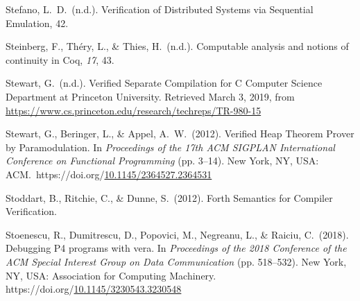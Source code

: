 \documentclass[12pt,twoside]{article}
\begin{document}
{\begin{thebibliography}{1079}
\mdbibitemlabel{}Stefano, L.~D.~(n.d.). Verification of Distributed Systems via Sequential Emulation, 42.%

\mdbibitemlabel{}Steinberg, F., Théry, L., \& Thies, H.~(n.d.). Computable analysis and notions of continuity in Coq, \emph{17}, 43.%

\mdbibitemlabel{}Stewart, G.~(n.d.). Verified Separate Compilation for C \textbar{} Computer Science Department at Princeton University. Retrieved March 3, 2019, from \href{https://www.cs.princeton.edu/research/techreps/TR-980-15}{{\ttfamily https://\hspace{0pt}www.\hspace{0pt}cs.\hspace{0pt}princeton.\hspace{0pt}edu/\hspace{0pt}research/\hspace{0pt}techreps/\hspace{0pt}TR-\hspace{0pt}980-\hspace{0pt}15}}%

\mdbibitemlabel{}Stewart, G., Beringer, L., \& Appel, A.~W.~(2012). Verified Heap Theorem Prover by Paramodulation. In \emph{Proceedings of the 17th ACM SIGPLAN International Conference on Functional Programming} (pp. 3–14). New York, NY, USA: ACM.~https://doi.org/\href{https://dx.doi.org/10.1145/2364527.2364531}{10.1145/2364527.2364531}%

\mdbibitemlabel{}Stoddart, B., Ritchie, C., \& Dunne, S.~(2012). Forth Semantics for Compiler Verification.%

\mdbibitemlabel{}Stoenescu, R., Dumitrescu, D., Popovici, M., Negreanu, L., \& Raiciu, C.~(2018). Debugging P4 programs with vera. In \emph{Proceedings of the 2018 Conference of the ACM Special Interest Group on Data Communication} (pp. 518–532). New York, NY, USA: Association for Computing Machinery. https://doi.org/\href{https://dx.doi.org/10.1145/3230543.3230548}{10.1145/3230543.3230548}%


\end{thebibliography}}
\end{document}
